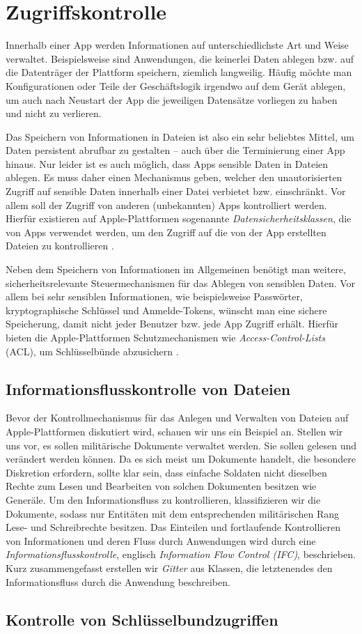 \section{Zugriffskontrolle}
Innerhalb einer App werden Informationen auf unterschiedlichste Art und Weise
verwaltet. Beispielsweise sind Anwendungen, die keinerlei Daten ablegen bzw. auf
die Datenträger der Plattform speichern, ziemlich langweilig. Häufig möchte man
Konfigurationen oder Teile der Geschäftslogik irgendwo auf dem Gerät ablegen, um
auch nach Neustart der App die jeweiligen Datensätze vorliegen zu haben und
nicht zu verlieren.

Das Speichern von Informationen in Dateien ist also ein sehr beliebtes Mittel,
um Daten persistent abrufbar zu gestalten -- auch über die Terminierung einer
App hinaus. Nur leider ist es auch möglich, dass Apps sensible Daten in Dateien
ablegen.  Es muss daher einen Mechanismus geben, welcher den unautorisierten
Zugriff auf sensible Daten innerhalb einer Datei verbietet bzw.  einschränkt.
Vor allem soll der Zugriff von anderen (unbekannten) Apps kontrolliert werden.
Hierfür existieren auf Apple-Plattformen sogenannte
\textit{Datensicherheitsklassen}, die von Apps verwendet werden, um den Zugriff
auf die von der App erstellten Dateien zu kontrollieren \cite[S. 50]{apple2020}.

Neben dem Speichern von Informationen im Allgemeinen benötigt man weitere,
sicherheitsrelevante Steuermechanismen für das Ablegen von sensiblen Daten. Vor
allem bei sehr sensiblen Informationen, wie beispielsweise Pass\-wör\-ter,
kryptographische Schlüssel und Anmelde-Tokens, wünscht man eine sichere
Speicherung, damit nicht jeder Benutzer bzw. jede App Zugriff erhält. Hierfür
bieten die Apple-Plattformen Schutzmechanismen wie \textit{Access-Control-Lists}
(ACL), um Schlüsselbünde abzusichern \cite[S. 55]{apple2020}.

\subsection{Informationsflusskontrolle von Dateien}
Bevor der Kontrollmechanismus für das Anlegen und Verwalten von Dateien auf
Apple-Plattformen diskutiert wird, schauen wir uns ein Beispiel an. Stellen wir
uns vor, es sollen militärische Dokumente verwaltet werden. Sie sollen gelesen
und verändert werden können. Da es sich meist um Dokumente handelt, die
besondere Diskretion erfordern, sollte klar sein, dass einfache Soldaten nicht
dieselben Rechte zum Lesen und Bearbeiten von solchen Dokumenten besitzen wie
Generäle. Um den Informationsfluss zu kontrollieren, klassifizieren wir die
Dokumente, sodass nur Entitäten mit dem entsprechenden militärischen Rang Lese-
und Schreibrechte besitzen. Das Einteilen und fortlaufende Kontrollieren von
Informationen und deren Fluss durch Anwendungen wird durch eine
\textit{Informationsflusskontrolle}, englisch \textit{Information Flow Control
(IFC)}, beschrieben. Kurz zusammengefasst erstellen wir \textit{Gitter} aus
Klassen, die letztenendes den Informationsfluss durch die Anwendung beschreiben.

\subsection{Kontrolle von Schlüsselbundzugriffen}

